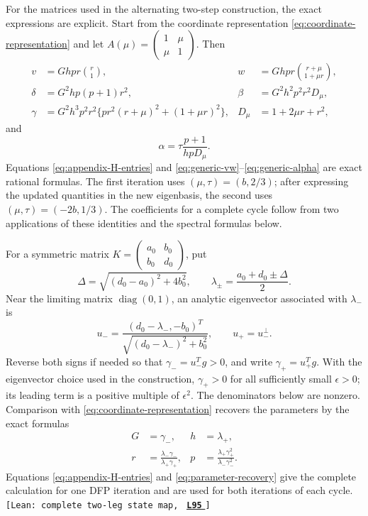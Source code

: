 \documentclass[11pt]{article}
\newcommand{\leanLinkText}[1]{%
  \underline{\textbf{#1}}%
}
\newcommand{\leanSnapshot}{e308927f5b7930bdd002f0c0e42b9d112ad821cb}
\newcommand{\leanClaimTag}[3]{%
  {\footnotesize\texttt{[Lean: #1, }}%
  \href{https://github.com/imathwy/DFP_wolfe_local/blob/\leanSnapshot/#2?plain=1\#L#3}%
    {\leanLinkText{\footnotesize\texttt{L#3}}}%
  {\footnotesize\texttt{]}}\enspace
}
\begin{document}
For the matrices used in the alternating two-step construction, the exact
expressions are explicit.  Start from the coordinate representation
\eqref{eq:coordinate-representation} and let
$A(\mu)=\left(\begin{smallmatrix}1&\mu\\\mu&1\end{smallmatrix}\right)$.
Then
\begin{align}
v&=Ghp r\binom{r}{1},
&w&=Ghp r\binom{r+\mu}{1+\mu r},
\label{eq:generic-vw}\\
\delta&=G^2hp(p+1)r^2,
&\beta&=G^2h^2p^2r^2D_\mu,
\label{eq:generic-delta-beta}\\
\gamma&=G^2h^3p^2r^2
\{pr^2(r+\mu)^2+(1+\mu r)^2\},
&D_\mu&=1+2\mu r+r^2,
\label{eq:generic-gamma}
\end{align}
and
\begin{equation}\label{eq:generic-alpha}
\alpha=\tau\frac{p+1}{hpD_\mu}.
\end{equation}
Equations \eqref{eq:appendix-H-entries} and
\eqref{eq:generic-vw}--\eqref{eq:generic-alpha} are exact rational formulas.
The first iteration uses $(\mu,\tau)=(b,2/3)$; after expressing the updated
quantities in the new eigenbasis, the second uses
$(\mu,\tau)=(-2b,1/3)$.  The coefficients for a complete cycle follow from two
applications of these identities and the spectral formulas below.

For a symmetric matrix
$K=\left(\begin{smallmatrix}a_0&b_0\\b_0&d_0\end{smallmatrix}\right)$,
put
\[
\Delta=\sqrt{(d_0-a_0)^2+4b_0^2},\qquad
\lambda_\pm=\frac{a_0+d_0\pm\Delta}{2}.
\]
Near the limiting matrix $\operatorname{diag}(0,1)$, an analytic eigenvector
associated with $\lambda_-$ is
\[
u_-=
\frac{(d_0-\lambda_-,-b_0)^T}
{\sqrt{(d_0-\lambda_-)^2+b_0^2}},
\qquad u_+=u_-^\perp.
\]
Reverse both signs if needed so that $\gamma_-=u_-^Tg>0$, and write
$\gamma_+=u_+^Tg$.  With the eigenvector choice used in the construction,
$\gamma_+>0$ for all sufficiently small $\epsilon>0$; its leading term is a
positive multiple of $\epsilon^2$.  The denominators below are nonzero.
Comparison with \eqref{eq:coordinate-representation} recovers the
parameters by the exact formulas
\begin{equation}\label{eq:parameter-recovery}
\begin{aligned}
G&=\gamma_-, & h&=\lambda_+,\\
r&=\frac{\lambda_-\gamma_-}{\lambda_+\gamma_+}, &
p&=\frac{\lambda_+\gamma_+^2}{\lambda_-\gamma_-^2}.
\end{aligned}
\end{equation}
Equations \eqref{eq:appendix-H-entries} and
\eqref{eq:parameter-recovery} give the complete calculation for one DFP
iteration and are used for both iterations of each cycle.
\leanClaimTag{complete two-leg state map}{DFPWolfe/A_uniformly_convex_counterexample_to_global_convergence_of_DFP_under_weak_Wolfe_/Appendix_Proposition_A_5a_Exact_complete_two_leg_state_map.lean}{95}
\end{document}
